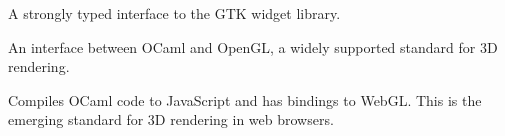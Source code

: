 \begin{description}
\tightlist
\item[\href{http://lablgtk.forge.ocamlcore.org}{Lablgtk}]
A strongly typed interface to the GTK widget library.
\item[\href{https://forge.ocamlcore.org/projects/lablgl/}{LablGL}]
An interface between OCaml and OpenGL, a widely supported standard for
3D rendering.
\item[\href{http://ocsigen.org/js_of_ocaml/api/Js}{js\_of\_ocaml}]
Compiles OCaml code to JavaScript and has bindings to WebGL. This is the
emerging standard for 3D rendering in web browsers.
\end{description}
